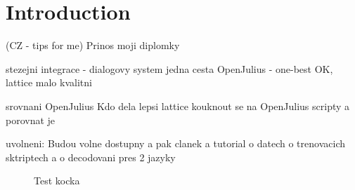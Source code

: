 \chapter{Introduction}
\label{chap:intro}

(CZ - tips for me)
Prinos moji diplomky
  
stezejni integrace - dialogovy system
    jedna cesta OpenJulius - one-best OK, lattice malo kvalitni

srovnani OpenJulius
    Kdo dela lepsi lattice
    kouknout se na OpenJulius scripty
    a porovnat je

uvolneni: Budou volne dostupny a pak clanek a tutorial
o datech o trenovacich sktriptech a o decodovani pres 2 jazyky


\begin{figure}
    \begin{center}
    
    \caption{Test kocka}
    \label{pic:kocka} 
    \end{center}
\end{figure}

